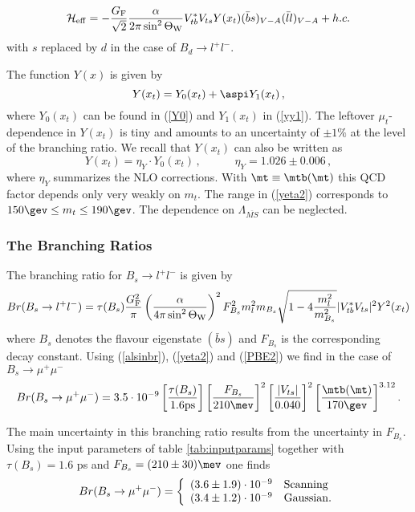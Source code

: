 \begin{equation}\label{hyll}
{\cal H}_{\rm eff} = -{G_{\rm F}\over \sqrt 2} {\alpha \over
2\pi \sin^2 \Theta_{\rm W}} V^\ast_{tb} V_{ts}
Y (x_t) (\bar bs)_{V-A} (\bar ll)_{V-A} + h.c.   \end{equation}
with $s$ replaced by $d$ in the
case of $B_d\to l^+l^-$.

The function $Y(x)$ is given by
\begin{equation}\label{yyx}
Y(x_t) = Y_0(x_t) + \aspi Y_1(x_t)\,,
\end{equation}
where $Y_0(x_t)$ can be found in (\ref{Y0})
and $Y_1(x_t)$ in (\ref{yy1}).
The leftover $\mu_t$-dependence in $Y(x_t)$ is tiny and amounts to
an uncertainty of $\pm 1\%$ at the level of the branching ratio.
We recall that $Y(x_t)$ can also be written as
\begin{equation}\label{yeta2}
Y(x_t)=\eta_Y\cdot Y_0(x_t)\,, \qquad\quad \eta_Y=1.026\pm 0.006\,,
\end{equation}
where $\eta_Y$ summarizes the NLO corrections.
With $\mt\equiv \mtb(\mt)$ this QCD factor
depends only very weakly on $m_t$. The range in (\ref{yeta2})
corresponds to $150\gev\leq m_t\leq 190\gev$. The dependence on
$\Lambda_{\overline{MS}}$ can be neglected. 

\subsubsection{The Branching Ratios}
The branching ratio for $B_s\to l^+l^-$ is given by \cite{BB2}
\begin{equation}\label{bbll}
Br(B_s\to l^+l^-)=\tau(B_s)\frac{G^2_{\rm F}}{\pi}
\left(\frac{\alpha}{4\pi\sin^2\Theta_{\rm W}}\right)^2 F^2_{B_s}m^2_l m_{B_s}
\sqrt{1-4\frac{m^2_l}{m^2_{B_s}}} |V^\ast_{tb}V_{ts}|^2 Y^2(x_t)
\end{equation}
where $B_s$ denotes the flavour eigenstate $(\bar bs)$ and $F_{B_s}$ is
the corresponding decay constant. Using
(\ref{alsinbr}), (\ref{yeta2}) and (\ref{PBE2}) we find in the
case of $B_s\to\mu^+\mu^-$
\begin{equation}\label{bbmmnum}
Br(B_s\to\mu^+\mu^-)=3.5\cdot 10^{-9}\left[\frac{\tau(B_s)}{1.6
\mbox{ps}}\right]
\left[\frac{F_{B_s}}{210\mev}\right]^2 
\left[\frac{|V_{ts}|}{0.040}\right]^2 
\left[\frac{\mtb(\mt)}{170\gev}\right]^{3.12}.
\end{equation}

The main uncertainty in this branching ratio results from
the uncertainty in $F_{B_s}$.
Using the input parameters of table \ref{tab:inputparams}
together with $\tau(B_s)=1.6$ ps and $F_{B_s}=(210\pm 30)\mev$ 
one finds \cite{BJL96b}
\begin{equation}\label{klpnr1}
Br(B_s\to\mu^+\mu^-)=\left\{ \begin{array}{ll}
(3.6 \pm 1.9)\cdot 10^{-9} & {\rm Scanning} \\
(3.4 \pm 1.2) \cdot 10^{-9} & {\rm Gaussian.} \end{array} \right.
\end{equation}

